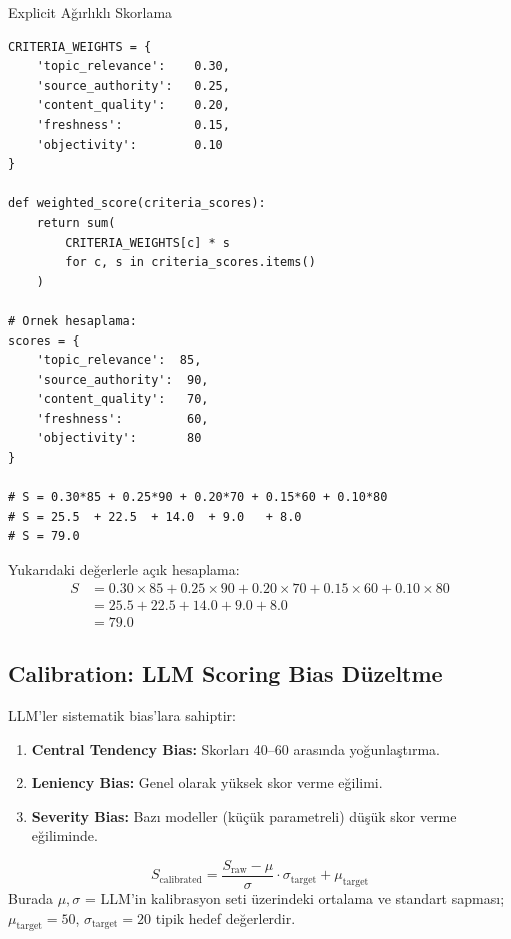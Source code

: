 \begin{kodref}{Explicit A\u{g}{\i}rl{\i}kl{\i} Skorlama}
\begin{lstlisting}
CRITERIA_WEIGHTS = {
    'topic_relevance':    0.30,
    'source_authority':   0.25,
    'content_quality':    0.20,
    'freshness':          0.15,
    'objectivity':        0.10
}

def weighted_score(criteria_scores):
    return sum(
        CRITERIA_WEIGHTS[c] * s
        for c, s in criteria_scores.items()
    )

# Ornek hesaplama:
scores = {
    'topic_relevance':  85,
    'source_authority':  90,
    'content_quality':   70,
    'freshness':         60,
    'objectivity':       80
}

# S = 0.30*85 + 0.25*90 + 0.20*70 + 0.15*60 + 0.10*80
# S = 25.5  + 22.5  + 14.0  + 9.0   + 8.0
# S = 79.0
\end{lstlisting}
\end{kodref}

\begin{ornek}
Yukar{\i}daki de\u{g}erlerle a\c{c}{\i}k hesaplama:
\begin{align}
S &= 0.30 \times 85 + 0.25 \times 90 + 0.20 \times 70 + 0.15 \times 60 + 0.10 \times 80 \nonumber \\
  &= 25.5 + 22.5 + 14.0 + 9.0 + 8.0 \nonumber \\
  &= 79.0
\end{align}
\end{ornek}

\subsection{Calibration: LLM Scoring Bias D\"{u}zeltme}

LLM'ler sistematik bias'lara sahiptir:
\begin{enumerate}
  \item \textbf{Central Tendency Bias:} Skorlar{\i} 40--60 aras{\i}nda yo\u{g}unla\c{s}t{\i}rma.
  \item \textbf{Leniency Bias:} Genel olarak y\"{u}ksek skor verme e\u{g}ilimi.
  \item \textbf{Severity Bias:} Baz{\i} modeller (k\"{u}\c{c}\"{u}k parametreli) d\"{u}\c{s}\"{u}k skor verme e\u{g}iliminde.
\end{enumerate}

\begin{formulbox}
\begin{equation}
\label{eq:calibration}
S_{\text{calibrated}} = \frac{S_{\text{raw}} - \mu}{\sigma} \cdot \sigma_{\text{target}} + \mu_{\text{target}}
\end{equation}
Burada $\mu, \sigma$ = LLM'in kalibrasyon seti \"{u}zerindeki ortalama ve standart sapmas{\i}; $\mu_{\text{target}} = 50$, $\sigma_{\text{target}} = 20$ tipik hedef de\u{g}erlerdir.
\end{formulbox}

